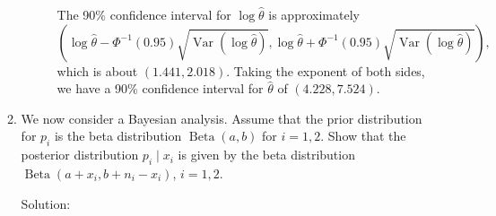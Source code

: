 \documentclass[letterpaper,11pt]{article}
\begin{document}
\begin{enumerate}
\begin{enumerate}
\begin{description}
      The 90\% confidence interval for $\log\hat{\theta}$ is approximately
      \begin{equation}
        \left(
          \log\hat{\theta} -
          \Phi^{-1}\left(0.95\right)
          \sqrt{\operatorname{Var}\left(\log\hat{\theta}\right)},
          \log\hat{\theta} +
          \Phi^{-1}\left(0.95\right)
          \sqrt{\operatorname{Var}\left(\log\hat{\theta}\right)}
        \right),
      \end{equation}
      which is about $\left(1.441, 2.018\right)$. Taking the exponent of both
      sides, we have a 90\% confidence interval for $\hat{\theta}$ of
      $\boxed{\left(4.228, 7.524\right).}$
    \end{description}
  \item We now consider a Bayesian analysis. Assume that the prior distribution
    for $p_i$ is the beta distribution $\operatorname{Beta}\left(a, b\right)$
    for $i = 1, 2$. Show that the posterior distribution $p_i \mid x_i$ is given
    by the beta distribution $\operatorname{Beta}\left(a+x_i, b + n_i - x_i\right)$,
    $i=1,2$.
    \begin{description}
    \item[Solution:] 
    \end{description}
  \end{enumerate}
\end{enumerate}
\end{document}
